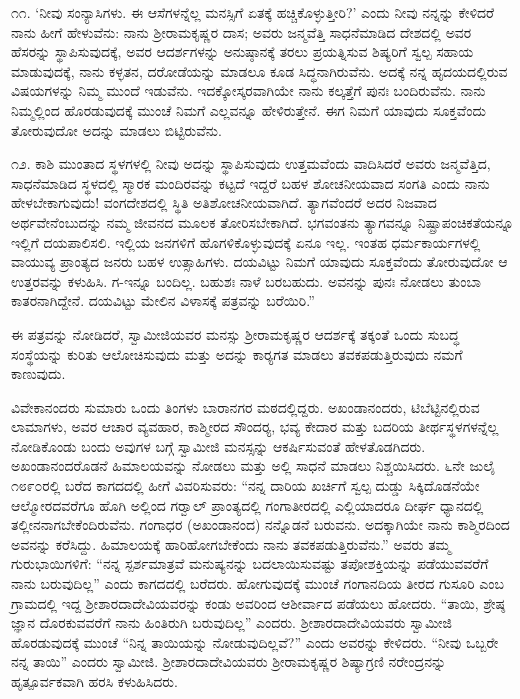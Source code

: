 ೧೧. ‘ನೀವು ಸಂನ್ಯಾಸಿಗಳು. ಈ ಆಸೆಗಳನ್ನೆಲ್ಲ ಮನಸ್ಸಿಗೆ ಏತಕ್ಕೆ ಹಚ್ಚಿಕೊಳ್ಳುತ್ತೀರಿ?’ ಎಂದು ನೀವು ನನ್ನನ್ನು ಕೇಳಿದರೆ ನಾನು ಹೀಗೆ ಹೇಳುವೆನು: ನಾನು ಶ‍್ರೀರಾಮಕೃಷ್ಣರ ದಾಸ; ಅವರು ಜನ್ಮವೆತ್ತಿ ಸಾಧನೆಮಾಡಿದ ದೇಶದಲ್ಲಿ ಅವರ ಹೆಸರನ್ನು ಸ್ಥಾಪಿಸುವುದಕ್ಕೆ, ಅವರ ಆದರ್ಶಗಳನ್ನು ಅನುಷ್ಠಾನಕ್ಕೆ ತರಲು ಪ್ರಯತ್ನಿಸುವ ಶಿಷ್ಯರಿಗೆ ಸ್ವಲ್ಪ ಸಹಾಯ ಮಾಡುವುದಕ್ಕೆ, ನಾನು ಕಳ್ಳತನ, ದರೋಡೆಯನ್ನು ಮಾಡಲೂ ಕೂಡ ಸಿದ್ಧನಾಗಿರುವೆನು. ಅದಕ್ಕೆ ನನ್ನ ಹೃದಯದಲ್ಲಿರುವ ವಿಷಯಗಳನ್ನು ನಿಮ್ಮ ಮುಂದೆ ಇಡುವೆನು. ಇದಕ್ಕೋಸ್ಕರವಾಗಿಯೇ ನಾನು ಕಲ್ಕತ್ತೆಗೆ ಪುನಃ ಬಂದಿರುವೆನು. ನಾನು ನಿಮ್ಮಲ್ಲಿಂದ ಹೊರಡುವುದಕ್ಕೆ ಮುಂಚೆ ನಿಮಗೆ ಎಲ್ಲವನ್ನೂ ಹೇಳಿರುತ್ತೇನೆ. ಈಗ ನಿಮಗೆ ಯಾವುದು ಸೂಕ್ತವೆಂದು ತೋರುವುದೋ ಅದನ್ನು ಮಾಡಲು ಬಿಟ್ಟಿರುವೆನು. 

 ೧೨. ಕಾಶಿ ಮುಂತಾದ ಸ್ಥಳಗಳಲ್ಲಿ ನೀವು ಅದನ್ನು ಸ್ಥಾಪಿಸುವುದು ಉತ್ತಮವೆಂದು ವಾದಿಸಿದರೆ ಅವರು ಜನ್ಮವೆತ್ತಿದ, ಸಾಧನೆಮಾಡಿದ ಸ್ಥಳದಲ್ಲಿ ಸ್ಮಾರಕ ಮಂದಿರವನ್ನು ಕಟ್ಟದೆ ಇದ್ದರೆ ಬಹಳ ಶೋಚನೀಯವಾದ ಸಂಗತಿ ಎಂದು ನಾನು ಹೇಳಬೇಕಾಗುವುದು! ವಂಗದೇಶದಲ್ಲಿ ಸ್ಥಿತಿ ಅತಿಶೋಚನೀಯವಾಗಿದೆ. ತ್ಯಾಗವೆಂದರೆ ಅದರ ನಿಜವಾದ ಅರ್ಥವೇನೆಂಬುದನ್ನು ನಮ್ಮ ಜೀವನದ ಮೂಲಕ ತೋರಿಸಬೇಕಾಗಿದೆ. ಭಗವಂತನು ತ್ಯಾಗವನ್ನೂ ನಿಷ್ಪ್ರಾಪಂಚಿಕತೆಯನ್ನೂ ಇಲ್ಲಿಗೆ ದಯಪಾಲಿಸಲಿ. ಇಲ್ಲಿಯ ಜನಗಳಿಗೆ ಹೊಗಳಿಕೊಳ್ಳುವುದಕ್ಕೆ ಏನೂ ಇಲ್ಲ. ಇಂತಹ ಧರ್ಮಕಾರ್ಯಗಳಲ್ಲಿ ವಾಯುವ್ಯ ಪ್ರಾಂತ್ಯದ ಜನರು ಬಹಳ ಉತ್ಸಾಹಿಗಳು. ದಯವಿಟ್ಟು ನಿಮಗೆ ಯಾವುದು ಸೂಕ್ತವೆಂದು ತೋರುವುದೋ ಆ ಉತ್ತರವನ್ನು ಕಳುಹಿಸಿ. ಗ-ಇನ್ನೂ ಬಂದಿಲ್ಲ. ಬಹುಶಃ ನಾಳೆ ಬರಬಹುದು. ಅವನನ್ನು ಪುನಃ ನೋಡಲು ತುಂಬಾ ಕಾತರನಾಗಿದ್ದೇನೆ. ದಯವಿಟ್ಟು ಮೇಲಿನ ವಿಳಾಸಕ್ಕೆ ಪತ್ರವನ್ನು ಬರೆಯಿರಿ.” 

 ಈ ಪತ್ರವನ್ನು ನೋಡಿದರೆ, ಸ್ವಾಮೀಜಿಯವರ ಮನಸ್ಸು ಶ‍್ರೀರಾಮಕೃಷ್ಣರ ಆದರ್ಶಕ್ಕೆ ತಕ್ಕಂತೆ ಒಂದು ಸುಬದ್ಧ ಸಂಸ್ಥೆಯನ್ನು ಕುರಿತು ಆಲೋಚಿಸುವುದು ಮತ್ತು ಅದನ್ನು ಕಾರ‍್ಯಗತ ಮಾಡಲು ತವಕಪಡುತ್ತಿರುವುದು ನಮಗೆ ಕಾಣುವುದು. 

 ವಿವೇಕಾನಂದರು ಸುಮಾರು ಒಂದು ತಿಂಗಳು ಬಾರಾನಗರ ಮಠದಲ್ಲಿದ್ದರು. ಅಖಂಡಾನಂದರು, ಟಿಬೆಟ್ಟಿನಲ್ಲಿರುವ ಲಾಮಾಗಳು, ಅವರ ಆಚಾರ ವ್ಯವಹಾರ, ಕಾಶ್ಮೀರದ ಸೌಂದರ‍್ಯ, ಭವ್ಯ ಕೇದಾರ ಮತ್ತು ಬದರಿಯ ತೀರ್ಥಸ್ಥಳಗಳನ್ನೆಲ್ಲ ನೋಡಿಕೊಂಡು ಬಂದು ಅವುಗಳ ಬಗ್ಗೆ ಸ್ವಾಮೀಜಿ ಮನಸ್ಸನ್ನು ಆಕರ್ಷಿಸುವಂತೆ ಹೇಳತೊಡಗಿದರು. ಅಖಂಡಾನಂದರೊಡನೆ ಹಿಮಾಲಯವನ್ನು ನೋಡಲು ಮತ್ತು ಅಲ್ಲಿ ಸಾಧನೆ ಮಾಡಲು ನಿಶ್ಚಯಿಸಿದರು. ೬ನೇ ಜುಲೈ ೧೮೯೦ರಲ್ಲಿ ಬರೆದ ಕಾಗದದಲ್ಲಿ ಹೀಗೆ ವಿವರಿಸುವರು: “ನನ್ನ ದಾರಿಯ ಖರ್ಚಿಗೆ ಸ್ವಲ್ಪ ದುಡ್ಡು ಸಿಕ್ಕಿದೊಡನೆಯೇ ಆಲ್ಮೋರದವರೆಗೂ ಹೊಗಿ ಅಲ್ಲಿಂದ ಗರ‍್ವಾಲ್ ಪ್ರಾಂತ್ಯದಲ್ಲಿ ಗಂಗಾತೀರದಲ್ಲಿ ಎಲ್ಲಿಯಾದರೂ ದೀರ್ಘ ಧ್ಯಾನದಲ್ಲಿ ತಲ್ಲೀನನಾಗಬೇಕೆಂದಿರುವೆನು. ಗಂಗಾಧರ (ಅಖಂಡಾನಂದ) ನನ್ನೊಡನೆ ಬರುವನು. ಅದಕ್ಕಾಗಿಯೇ ನಾನು ಕಾಶ್ಮಿರದಿಂದ ಅವನನ್ನು ಕರೆಸಿದ್ದು. ಹಿಮಾಲಯಕ್ಕೆ ಹಾರಿಹೋಗಬೇಕೆಂದು ನಾನು ತವಕಪಡುತ್ತಿರುವೆನು.” ಅವರು ತಮ್ಮ ಗುರುಭಾಯಿಗಳಿಗೆ: “ನನ್ನ ಸ್ಪರ್ಶಮಾತ್ರವೆ ಮನುಷ್ಯನನ್ನು ಬದಲಾಯಿಸುವಷ್ಟು ತಪೋಶಕ್ತಿಯನ್ನು ಪಡೆಯುವವರೆಗೆ ನಾನು ಬರುವುದಿಲ್ಲ” ಎಂದು ಕಾಗದದಲ್ಲಿ ಬರೆದರು. ಹೋಗುವುದಕ್ಕೆ ಮುಂಚೆ ಗಂಗಾನದಿಯ ತೀರದ ಗುಸೂರಿ ಎಂಬ ಗ್ರಾಮದಲ್ಲಿ ಇದ್ದ ಶ‍್ರೀಶಾರದಾದೇವಿಯವರನ್ನು ಕಂಡು ಅವರಿಂದ ಆಶೀರ್ವಾದ ಪಡೆಯಲು ಹೋದರು. “ತಾಯಿ, ಶ್ರೇಷ್ಠ ಜ್ಞಾನ ದೊರಕುವವರೆಗೆ ನಾನು ಹಿಂತಿರುಗಿ ಬರುವುದಿಲ್ಲ” ಎಂದರು. ಶ‍್ರೀಶಾರದಾದೇವಿ\-ಯವರು ಸ್ವಾಮೀಜಿ ಹೊರಡುವುದಕ್ಕೆ ಮುಂಚೆ “ನಿನ್ನ ತಾಯಿಯನ್ನು ನೋಡುವುದಿಲ್ಲವೆ?” ಎಂದು ಅವರನ್ನು ಕೇಳಿದರು. “ನೀವು ಒಬ್ಬರೇ ನನ್ನ ತಾಯಿ” ಎಂದರು ಸ್ವಾಮೀಜಿ. ಶ‍್ರೀಶಾರದಾದೇವಿಯವರು ಶ‍್ರೀರಾಮಕೃಷ್ಣರ ಶಿಷ್ಯಾಗ್ರಣಿ ನರೇಂದ್ರನನ್ನು ಹೃತ್ಪೂರ್ವಕವಾಗಿ ಹರಸಿ ಕಳುಹಿಸಿದರು.

